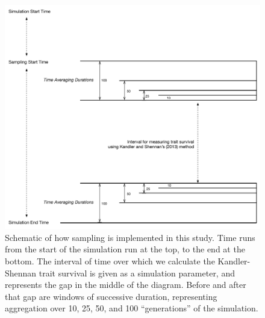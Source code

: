 \documentclass[10pt,letterpaper]{article}
\begin{document}
\begin{figure}[ht]
\centering\includegraphics[scale=0.4]{figure/time-averaging-with-kandler-sampling.pdf}
\caption{Schematic of how sampling is implemented in this study.  Time runs from the start of the simulation run at the top, to the end at the bottom.  The interval of time over which we calculate the Kandler-Shennan trait survival is given as a simulation parameter, and represents the gap in the middle of the diagram.  Before and after that gap are windows of successive duration, representing aggregation over 10, 25, 50, and 100 ``generations'' of the simulation.}
\label{img:timeaveraging}	
\end{figure}
\end{document}
